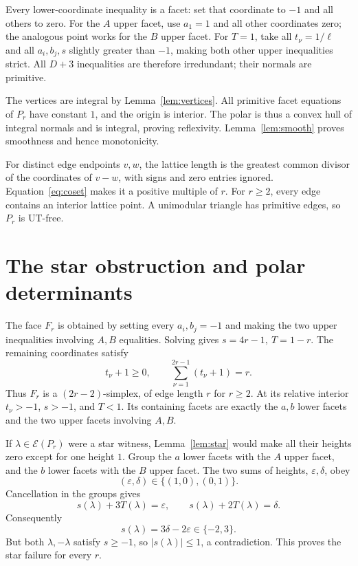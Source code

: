\documentclass[11pt]{article}
\theoremstyle{remark}\newtheorem{remark}[theorem]{Remark}
\newcommand{\E}{\mathcal E}
\begin{document}
Every lower-coordinate inequality is a facet: set that coordinate to
\(-1\) and all others to zero.
For the \(A\) upper facet, use \(a_1=1\) and all other coordinates zero;
the analogous point works for the \(B\) upper facet.
For \(T=1\), take all \(t_\nu=1/\ell\) and all \(a_i,b_j,s\) slightly
greater than \(-1\), making both other upper inequalities strict.
All \(D+3\) inequalities are therefore irredundant; their normals
are primitive.

The vertices are integral by Lemma~\ref{lem:vertices}.
All primitive facet equations of \(P_r\) have constant \(1\), and the
origin is interior. The polar is thus a convex hull of integral
normals and is integral, proving reflexivity.
Lemma~\ref{lem:smooth} proves smoothness and hence monotonicity.

For distinct edge endpoints \(v,w\), the lattice length is the greatest
common divisor of the coordinates of \(v-w\), with signs and zero
entries ignored. Equation~\eqref{eq:coset} makes it a positive multiple
of \(r\). For \(r\ge2\), every edge contains an interior lattice point.
A unimodular triangle has primitive edges, so \(P_r\) is UT-free.

\section{The star obstruction and polar determinants}

The face \(F_r\) is obtained by setting every \(a_i,b_j=-1\) and
making the two upper inequalities involving \(A,B\) equalities.
Solving gives \(s=4r-1,\ T=1-r\).
The remaining coordinates satisfy
\[
 t_\nu+1\ge0,\qquad\sum_{\nu=1}^{2r-1}(t_\nu+1)=r.
\]
Thus \(F_r\) is a \((2r-2)\)-simplex, of edge length \(r\) for \(r\ge2\).
At its relative interior \(t_\nu>-1\), \(s>-1\), and \(T<1\).
Its containing facets are exactly the \(a,b\) lower facets and the
two upper facets involving \(A,B\).

If \(\lambda\in\E(P_r)\) were a star witness, Lemma~\ref{lem:star}
would make all their heights zero except for one height \(1\).
Group the \(a\) lower facets with the \(A\) upper facet, and the \(b\)
lower facets with the \(B\) upper facet.
The two sums of heights, \(\varepsilon,\delta\), obey
\[
       (\varepsilon,\delta)\in\{(1,0),(0,1)\}.
\]
Cancellation in the groups gives
\[
 s(\lambda)+3T(\lambda)=\varepsilon,\qquad
 s(\lambda)+2T(\lambda)=\delta.
\]
Consequently
\begin{equation}\label{eq:contradiction}
               s(\lambda)=3\delta-2\varepsilon\in\{-2,3\}.
\end{equation}
But both \(\lambda,-\lambda\) satisfy \(s\ge-1\), so
\(|s(\lambda)|\le1\), a contradiction. This proves the star failure
for every \(r\).
\end{document}
